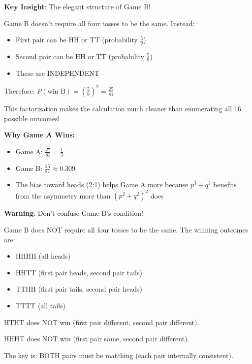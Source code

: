 \documentclass[]{article}
\begin{document}
\begin{keyinsightbox}
\textbf{Key Insight}: The elegant structure of Game B!

Game B doesn't require all four tosses to be the same. Instead:
\begin{itemize}
    \item First pair can be HH or TT (probability $\frac{5}{9}$)
    \item Second pair can be HH or TT (probability $\frac{5}{9}$)
    \item These are INDEPENDENT
\end{itemize}

Therefore: $P(\text{win B}) = \left(\frac{5}{9}\right)^2 = \frac{25}{81}$

This factorization makes the calculation much cleaner than enumerating all 16 possible outcomes!

\textbf{Why Game A Wins:}
\begin{itemize}
    \item Game A: $\frac{27}{81} = \frac{1}{3}$
    \item Game B: $\frac{25}{81} \approx 0.309$
    \item The bias toward heads (2:1) helps Game A more because $p^3 + q^3$ benefits from the asymmetry more than $(p^2 + q^2)^2$ does
\end{itemize}
\end{keyinsightbox}

\begin{warningbox}
\textbf{Warning}: Don't confuse Game B's condition!

Game B does NOT require all four tosses to be the same. The winning outcomes are:
\begin{itemize}
    \item HHHH (all heads)
    \item HHTT (first pair heads, second pair tails)
    \item TTHH (first pair tails, second pair heads)
    \item TTTT (all tails)
\end{itemize}

HTHT does NOT win (first pair different, second pair different).

HHHT does NOT win (first pair same, second pair different).

The key is: BOTH pairs must be matching (each pair internally consistent).
\end{warningbox}
\end{document}
